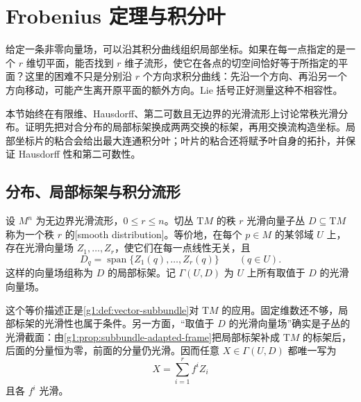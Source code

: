 
% 
% 

\section{Frobenius 定理与积分叶}
\label{g1:sec:1304}

给定一条非零向量场，可以沿其积分曲线组织局部坐标。如果在每一点指定的是一个 \(r\) 维切平面，能否找到 \(r\) 维子流形，使它在各点的切空间恰好等于所指定的平面？这里的困难不只是分别沿 \(r\) 个方向求积分曲线：先沿一个方向、再沿另一个方向移动，可能产生离开原平面的额外方向。Lie 括号正好测量这种不相容性。

\ProseParagraphBreak

本节始终在有限维、Hausdorff、第二可数且无边界的光滑流形上讨论常秩光滑分布。证明先把对合分布的局部标架换成两两交换的标架，再用交换流构造坐标。局部坐标片的粘合会给出最大连通积分叶；叶片的粘合还将赋予叶自身的拓扑，并保证 Hausdorff 性和第二可数性。

\subsection{分布、局部标架与积分流形}
\label{g1:subsec:1304:01}

\begin{definition}\label{g1:def:smooth-distribution}
	设 \(M^n\) 为无边界光滑流形，\(0\le r\le n\)。切丛 \(\mathrm{T}M\) 的秩 \(r\) 光滑向量子丛 \(D\subseteq \mathrm{T}M\) 称为一个秩 \(r\) 的[smooth distribution]。等价地，在每个 \(p\in M\) 的某邻域 \(U\) 上，存在光滑向量场 \(Z_1,\ldots,Z_r\)，使它们在每一点线性无关，且
	\[
		D_q=\operatorname{span}\{Z_1(q),\ldots,Z_r(q)\}\qquad(q\in U).
	\]
	这样的向量场组称为 \(D\) 的局部标架。记 \(\Gamma(U,D)\) 为 \(U\) 上所有取值于 \(D\) 的光滑向量场。
\end{definition}

这个等价描述正是\cref{g1:def:vector-subbundle}对 \(\mathrm{T}M\) 的应用。固定维数还不够，局部标架的光滑性也属于条件。另一方面，“取值于 \(D\) 的光滑向量场”确实是子丛的光滑截面：由\cref{g1:prop:subbundle-adapted-frame}把局部标架补成 \(\mathrm{T}M\) 的标架后，后面的分量恒为零，前面的分量仍光滑。因而任意 \(X\in\Gamma(U,D)\) 都唯一写为
\[
	X=\sum_{i=1}^r f^iZ_i
\]
且各 \(f^i\) 光滑。

